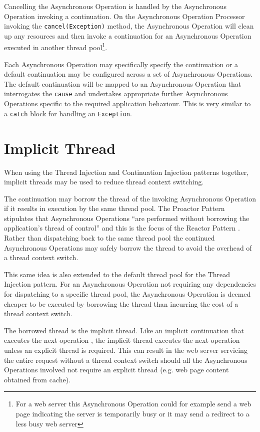 \documentclass[prodmode]{style/acmlarge}
\begin{document}
Cancelling the Asynchronous Operation is handled by the Asynchronous Operation
invoking a continuation.  On the Asynchronous Operation Processor invoking the
\texttt{cancel(Exception)} method, the Asynchronous Operation will clean up any
resources and then invoke a continuation for an Asynchronous Operation executed
in another thread pool\footnote{For a web server this Asynchronous Operation
could for example send a web page indicating the server is temporarily busy or
it may send a redirect to a less busy web server}.

Each Asynchronous Operation may specifically specify the continuation or a
default continuation may be configured across a set of Asynchronous Operations.
The default continuation will be mapped to an Asynchronous Operation that
interrogates the \texttt{cause} and undertakes appropriate further Asynchronous
Operations specific to the required application behaviour.  This is very similar
to a \texttt{catch} block for handling an \texttt{Exception}.


\section{Implicit Thread}

When using the Thread Injection and Continuation Injection patterns together,
implicit threads may be used to reduce thread context switching.

The continuation may borrow the thread of the invoking Asynchronous Operation if
it results in execution by the same thread pool.  The Proactor Pattern
stipulates that Asynchronous Operations ``are performed without borrowing the
application's thread of control'' \cite{proactor} and this is the focus of the
Reactor Pattern \cite{reactor}.  Rather than dispatching back to the same thread
pool the continued Asynchronous Operations may safely borrow the thread to avoid
the overhead of a thread context switch.

This same idea is also extended to the default thread pool for the Thread
Injection pattern.  For an Asynchronous Operation not requiring any dependencies
for dispatching to a specific thread pool, the Asynchronous Operation is deemed
cheaper to be executed by borrowing the thread than incurring the cost of a
thread context switch.

The borrowed thread is the implicit thread.  Like an implicit continuation that
executes the next operation \cite{continuations}, the implicit thread executes
the next operation unless an explicit thread is required.  This can result in
the web server servicing the entire request without a thread context switch
should all the Asynchronous Operations involved not require an explicit thread
(e.g. web page content obtained from cache).
\end{document}
